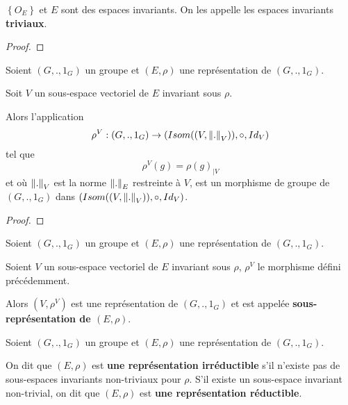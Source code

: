 \begin{proposition}
	$\left\{ O_{E} \right\}$ et $E$ sont des espaces invariants. On les appelle
	les espaces invariants \textbf{triviaux}.
\end{proposition}

\ifdefined\outputproof
\begin{proof}

\end{proof}
\fi

\begin{proposition}
	Soient $(G, ., 1_{G})$ un groupe et $(E, \rho)$ une représentation de $(G, ., 1_{G})$.

	Soit $V$ un sous-espace vectoriel de $E$ invariant sous $\rho$.

	Alors l'application
	\begin{equation}
		\rho^{V} : (G, ., 1_{G}) \rightarrow
		(Isom((V, \norm{.}_{V})), \circ, Id_{V})
	\end{equation}
	tel que
	\begin{equation}
		\rho^{V}(g) = \rho(g)_{|V}
	\end{equation}
	et où $\norm{.}_{V}$ est la norme $\norm{.}_{E}$ restreinte à $V$,
	est un morphisme de groupe de $(G, ., 1_{G})$ dans $(Isom((V,
		\norm{.}_{V})), \circ, Id_{V})$.
\end{proposition}

\ifdefined\outputproof
\begin{proof}

\end{proof}
\fi

\begin{definition} 
	Soient $(G, ., 1_{G})$ un groupe et $(E, \rho)$ une représentation de $(G, ., 1_{G})$.

	Soient $V$ un sous-espace vectoriel de $E$ invariant sous $\rho$, $\rho^{V}$
	le morphisme défini précédemment.

	Alors $(V, \rho^{V})$ est une représentation de $(G, .,
	1_{G})$ et est appelée \textbf{sous-représentation de $(E, \rho)$}.
\end{definition}

\begin{definition} 
	Soient $(G, ., 1_{G})$ un groupe et $(E, \rho)$ une représentation de $(G, ., 1_{G})$.

	On dit que $(E, \rho)$ est \textbf{une représentation
	irréductible} s'il
	n'existe pas de sous-espaces invariants non-triviaux pour $\rho$. S'il
	existe un sous-espace invariant non-trivial, on dit que $(E, \rho)$ est
	\textbf{une représentation réductible}.
\end{definition}

